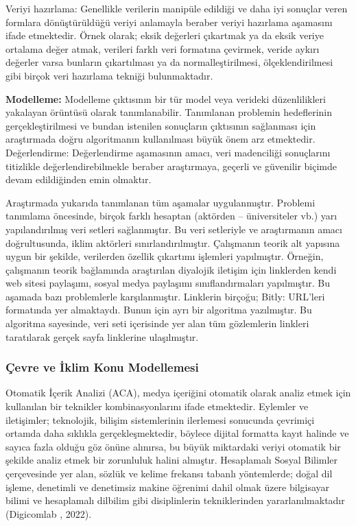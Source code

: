 \documentclass[
]{book}
\begin{document}
Veriyi hazırlama: Genellikle verilerin manipüle edildiği ve daha iyi sonuçlar veren formlara dönüştürüldüğü veriyi anlamayla beraber veriyi hazırlama aşamasını ifade etmektedir. Örnek olarak; eksik değerleri çıkartmak ya da eksik veriye ortalama değer atmak, verileri farklı veri formatına çevirmek, veride aykırı değerler varsa bunların çıkartılması ya da normalleştirilmesi, ölçeklendirilmesi gibi birçok veri hazırlama tekniği bulunmaktadır.

\textbf{Modelleme:} Modelleme çıktısının bir tür model veya verideki düzenlilikleri yakalayan örüntüsü olarak tanımlanabilir. Tanımlanan problemin hedeflerinin gerçekleştirilmesi ve bundan istenilen sonuçların çıktısının sağlanması için araştırmada doğru algoritmanın kullanılması büyük önem arz etmektedir.
Değerlendirme: Değerlendirme aşamasının amacı, veri madenciliği sonuçlarını titizlikle değerlendirebilmekle beraber araştırmaya, geçerli ve güvenilir biçimde devam edildiğinden emin olmaktır.

Araştırmada yukarıda tanımlanan tüm aşamalar uygulanmıştır. Problemi tanımlama öncesinde, birçok farklı hesaptan (aktörden -- üniversiteler vb.) yarı yapılandırılmış veri setleri sağlanmıştır. Bu veri setleriyle ve araştırmanın amacı doğrultusunda, iklim aktörleri sınırlandırılmıştır. Çalışmanın teorik alt yapısına uygun bir şekilde, verilerden özellik çıkartımı işlemleri yapılmıştır. Örneğin, çalışmanın teorik bağlamında araştırılan diyalojik iletişim için linklerden kendi web sitesi paylaşımı, sosyal medya paylaşımı sınıflandırmaları yapılmıştır. Bu aşamada bazı problemlerle karşılanmıştır. Linklerin birçoğu; Bitly: URL'leri formatında yer almaktaydı. Bunun için ayrı bir algoritma yazılmıştır. Bu algoritma sayesinde, veri seti içerisinde yer alan tüm gözlemlerin linkleri taratılarak gerçek sayfa linklerine ulaşılmıştır.

\hypertarget{uxe7evre-ve-iklim-konu-modellemesi}{%
\subsubsection{Çevre ve İklim Konu Modellemesi}\label{uxe7evre-ve-iklim-konu-modellemesi}}

Otomatik İçerik Analizi (ACA), medya içeriğini otomatik olarak analiz etmek için kullanılan bir teknikler kombinasyonlarını ifade etmektedir. Eylemler ve iletişimler; teknolojik, bilişim sistemlerinin ilerlemesi sonucunda çevrimiçi ortamda daha sıklıkla gerçekleşmektedir, böylece dijital formatta kayıt halinde ve sayıca fazla olduğu göz önüne alınırsa, bu büyük miktardaki veriyi otomatik bir şekilde analiz etmek bir zorunluluk halini almıştır. Hesaplamalı Sosyal Bilimler çerçevesinde yer alan, sözlük ve kelime frekansı tabanlı yöntemlerde; doğal dil işleme, denetimli ve denetimsiz makine öğrenimi dahil olmak üzere bilgisayar bilimi ve hesaplamalı dilbilim gibi disiplinlerin tekniklerinden yararlanılmaktadır (Digicomlab , 2022).
\end{document}
